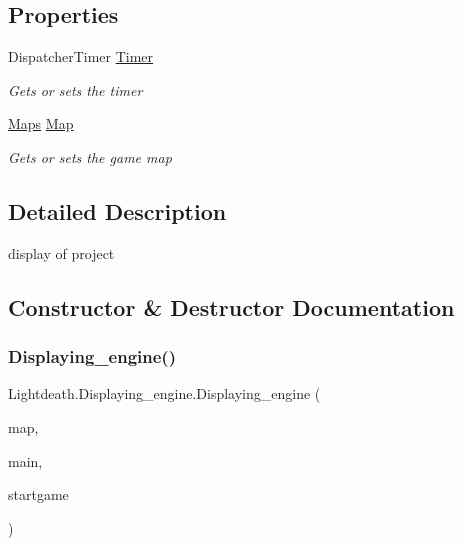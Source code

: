 \subsection*{Properties}
\begin{DoxyCompactItemize}
\item 
Dispatcher\+Timer \hyperlink{class_lightdeath_1_1_displaying__engine_a98086ed7c5ba5e215bc77d3bf6c9c7c2}{Timer}
\begin{DoxyCompactList}\small\item\em Gets or sets the timer \end{DoxyCompactList}\item 
\hyperlink{class_lightdeath_1_1_maps}{Maps} \hyperlink{class_lightdeath_1_1_displaying__engine_a914b56713dcb4b219b2f18c584c09df2}{Map}
\begin{DoxyCompactList}\small\item\em Gets or sets the game map \end{DoxyCompactList}\end{DoxyCompactItemize}


\subsection{Detailed Description}
display of project 



\subsection{Constructor \& Destructor Documentation}
\hypertarget{class_lightdeath_1_1_displaying__engine_adfb7ade67964f42515d3dcee36ba8b31}{}\label{class_lightdeath_1_1_displaying__engine_adfb7ade67964f42515d3dcee36ba8b31} 
\subsubsection{\texorpdfstring{Displaying\+\_\+engine()}{Displaying\_engine()}}
{\footnotesize\ttfamily Lightdeath.\+Displaying\+\_\+engine.\+Displaying\+\_\+engine (\begin{DoxyParamCaption}\item[{\hyperlink{class_lightdeath_1_1_maps}{Maps}}]{map,  }\item[{\hyperlink{class_lightdeath_1_1_main_window}{Main\+Window}}]{main,  }\item[{\hyperlink{class_lightdeath_1_1_start_game_screen}{Start\+Game\+Screen}}]{startgame }\end{DoxyParamCaption})\hspace{0.3cm}{\ttfamily [inline]}}



